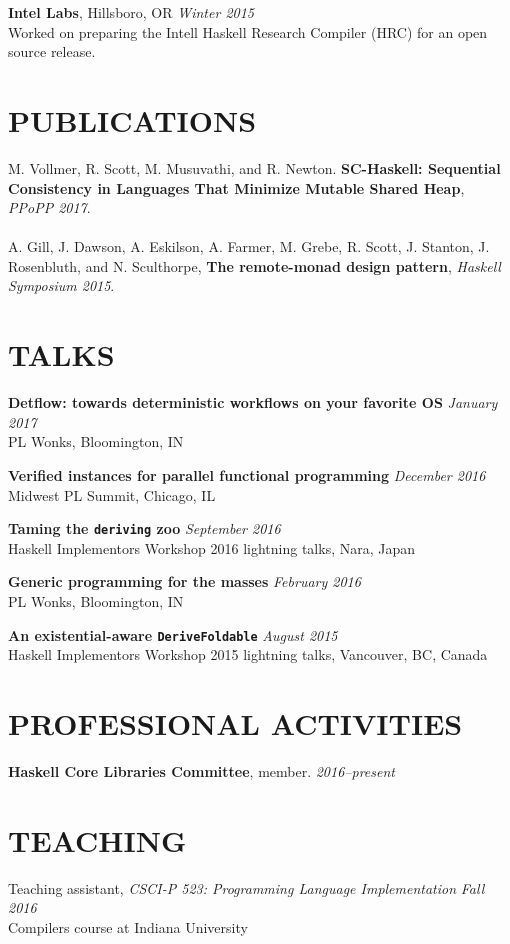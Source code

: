 \documentclass{res}
\begin{document}
\begin{resume}
    \textbf{Intel Labs}, Hillsboro, OR \hfill \textit{Winter 2015} \\
    Worked on preparing the Intell Haskell Research Compiler (HRC) for an open source release.

\section{PUBLICATIONS}
        M. Vollmer, R. Scott, M. Musuvathi, and R. Newton. \textbf{SC-Haskell: Sequential Consistency in Languages That Minimize Mutable Shared Heap}, \textit{PPoPP 2017}. \\ \\
        A. Gill, J. Dawson, A. Eskilson, A. Farmer, M. Grebe, R. Scott, J. Stanton, J. Rosenbluth, and N. Sculthorpe, \textbf{The remote-monad design pattern}, \textit{Haskell Symposium 2015}.


\section{TALKS}
    \textbf{Detflow: towards deterministic workflows on your favorite OS} \hfill \textit{January 2017} \\
    PL Wonks, Bloomington, IN

    \textbf{Verified instances for parallel functional programming} \hfill \textit{December 2016} \\
    Midwest PL Summit, Chicago, IL

    \textbf{Taming the \texttt{deriving} zoo} \hfill \textit{September 2016} \\
    Haskell Implementors Workshop 2016 lightning talks, Nara, Japan

    \textbf{Generic programming for the masses} \hfill \textit{February 2016} \\
    PL Wonks, Bloomington, IN

    \textbf{An existential-aware \texttt{DeriveFoldable}} \hfill \textit{August 2015} \\
    Haskell Implementors Workshop 2015 lightning talks, Vancouver, BC, Canada

\section{PROFESSIONAL ACTIVITIES}
    \textbf{Haskell Core Libraries Committee}, member. \hfill \textit{2016--present}

\section{TEACHING}
    Teaching assistant, \textit{CSCI-P 523: Programming Language Implementation} \hfill \textit{Fall 2016} \\
    Compilers course at Indiana University

\end{resume}
\end{document}
